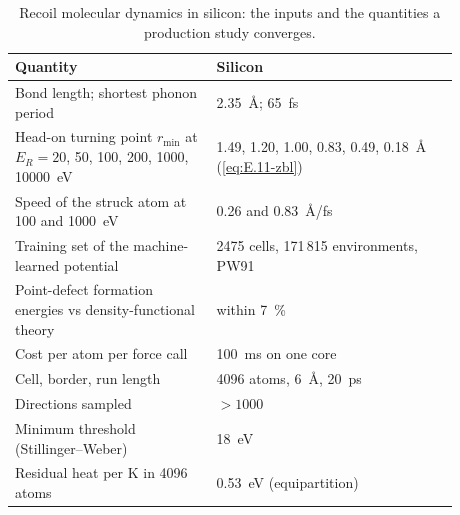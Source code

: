 \begin{table}[t]
  \caption{Recoil molecular dynamics in silicon: the inputs and the quantities a production study converges.}
  \label{tab:E-md-si}
  \centering
  \begin{tabular}{p{0.40\linewidth}p{0.48\linewidth}}
    \toprule
    Quantity & Silicon \\
    \midrule
    Bond length; shortest phonon period & \SI{2.35}{\angstrom}; \SI{65}{fs} \\
    Head-on turning point $r_{\mathrm{min}}$ at $E_R = 20$, 50, 100, 200, 1000, \SI{10000}{eV} & 1.49, 1.20, 1.00, 0.83, 0.49, \SI{0.18}{\angstrom} (\cref{eq:E.11-zbl}) \\
    Speed of the struck atom at 100 and \SI{1000}{eV} & 0.26 and \SI{0.83}{\angstrom/fs} \\
    Training set of the machine-learned potential & 2475 cells, 171\,815 environments, PW91~\cite{bartok2018machine} \\
    Point-defect formation energies vs density-functional theory & within \SI{7}{\percent}~\cite{bartok2018machine} \\
    Cost per atom per force call & \SI{100}{ms} on one core~\cite{bartok2018machine} \\
    Cell, border, run length & 4096 atoms, \SI{6}{\angstrom}, \SI{20}{ps}~\cite{sassi2022energy} \\
    Directions sampled & $> 1000$~\cite{sassi2022energy} \\
    Minimum threshold (Stillinger--Weber) & \SI{18}{eV}~\cite{sassi2022energy} \\
    Residual heat per K in 4096 atoms & \SI{0.53}{eV} (equipartition) \\
    \bottomrule
  \end{tabular}
\end{table}
